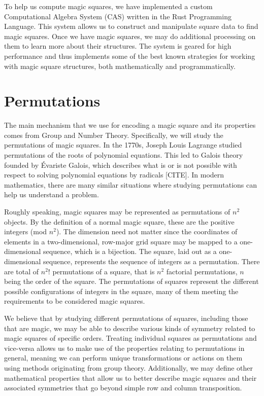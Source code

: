 \documentclass[12pt]{report}
\begin{document}
\par To help us compute magic squares, we have implemented a custom Computational Algebra System
(CAS) written in the Rust Programming Language. This system allows us to construct and manipulate
square data to find magic squares. Once we have magic squares, we may do additional processing on
them to learn more about their structures. The system is geared for high performance and thus
implements some of the best known strategies for working with magic square structures, both
mathematically and programmatically.

\section{Permutations}

\par The main mechanism that we use for encoding a magic square and its properties comes from Group
and Number Theory. Specifically, we will study the permutations of magic squares. In the 1770s,
Joseph Louis Lagrange studied permutations of the roots of polynomial equations. This led to Galois
theory founded by Évariste Galois, which describes what is or is not possible with respect to
solving polynomial equations by radicals [CITE]. In modern mathematics, there are many similar
situations where studying permutations can help us understand a problem.

\par Roughly speaking, magic squares may be represented as permutations of $n^2$ objects. By the
definition of a normal magic square, these are the positive integers (mod $n^2$). The dimension
need not matter since the coordinates of elements in a two-dimensional, row-major grid square may
be mapped to a one-dimensional sequence, which is a bijection. The square, laid out as a
one-dimensional sequence, represents the sequence of integers as a permutation. There are total of
$n^{2}$! permutations of a square, that is $n^2$ factorial permutations, $n$ being the order of the
square. The permutations of squares represent the different possible configurations of integers in
the square, many of them meeting the requirements to be considered magic squares.

\par We believe that by studying different permutations of squares, including those that are magic,
we may be able to describe various kinds of symmetry related to magic squares of specific orders.
Treating individual squares as permutations and vice-versa allows us to make use of the properties
relating to permutations in general, meaning we can perform unique transformations or actions on
them using methods originating from group theory. Additionally, we may define other mathematical
properties that allow us to better describe magic squares and their associated symmetries that go
beyond simple row and column transposition.
\end{document}
